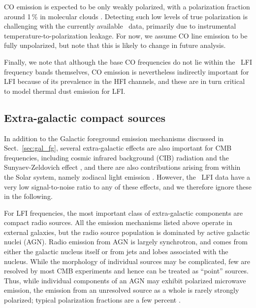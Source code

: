 \documentclass[onecolumn]{aa}
\begin{document}
CO emission is expected to be only weakly polarized, with a
polarization fraction around 1\,\% in molecular clouds
\citep{greaves:1999}. Detecting such low levels of true polarization
is challenging with the currently available \Planck\ data, primarily
due to instrumental temperature-to-polarization leakage. For now, we
assume CO line emission to be fully unpolarized, but note that this 
is likely to change in future analysis.

Finally, we note that although the base CO frequencies do not lie
within the \Planck\ LFI frequency bands themselves, CO emission is
nevertheless indirectly important for LFI because of its prevalence in
the HFI channels, and these are in turn critical to model thermal dust
emission for LFI.

\subsection{Extra-galactic compact sources}
\label{sec:pointsources}

In addition to the Galactic foreground emission mechanisms discussed
in Sect.~\ref{sec:gal_fg}, several extra-galactic effects are also
important for CMB frequencies, including cosmic infrared background
(CIB) radiation \citep{hauser:2001} and the Sunyaev-Zeldovich effect
\citep{sunyaev:1972}, and there are also contributions arising from
within the Solar system, namely zodiacal light emission
\citep{kelsall1998,planck2014-a12,san:2022}. However, the \Planck\ LFI
data have a very low signal-to-noise ratio to any of these effects,
and we therefore ignore these in the following.

For LFI frequencies, the most important class of extra-galactic
components are compact radio sources. All the emission mechanisms
listed above operate in external galaxies, but the radio source
population is dominated by active galactic nuclei (AGN). Radio
emission from AGN is largely synchrotron, and comes from either the
galactic nucleus itself or from jets and lobes associated with the
nucleus.  While the morphology of individual sources may be
complicated, few are resolved by most CMB experiments and hence can be
treated as ``point'' sources. Thus, while individual components of an
AGN may exhibit polarized microwave emission, the emission from an unresolved 
source as a whole is rarely strongly polarized; typical polarization
fractions are a few percent \citep{datta2019}. 
\end{document}
